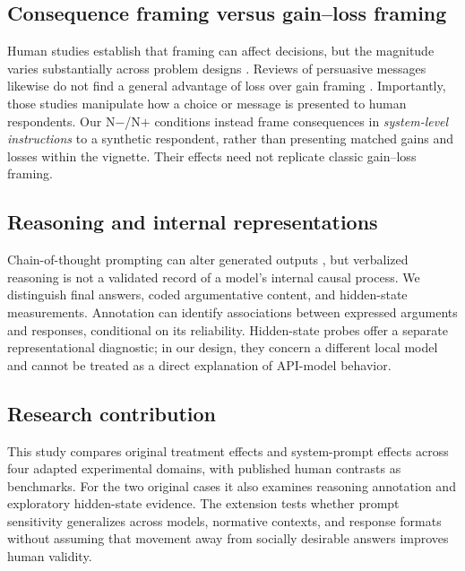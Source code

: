 \subsection{Consequence framing versus gain--loss framing}

Human studies establish that framing can affect decisions, but the magnitude varies substantially across problem designs \cite{kuhberger1998}. Reviews of persuasive messages likewise do not find a general advantage of loss over gain framing \cite{okeefeJensen2006}. Importantly, those studies manipulate how a choice or message is presented to human respondents. Our N$-$/N$+$ conditions instead frame consequences in \emph{system-level instructions} to a synthetic respondent, rather than presenting matched gains and losses within the vignette. Their effects need not replicate classic gain--loss framing.

\subsection{Reasoning and internal representations}

Chain-of-thought prompting can alter generated outputs \cite{wei2022,kojima2022}, but verbalized reasoning is not a validated record of a model's internal causal process. We distinguish final answers, coded argumentative content, and hidden-state measurements. Annotation can identify associations between expressed arguments and responses, conditional on its reliability. Hidden-state probes offer a separate representational diagnostic; in our design, they concern a different local model and cannot be treated as a direct explanation of API-model behavior.

\subsection*{Research contribution}

This study compares original treatment effects and system-prompt effects across four adapted experimental domains, with published human contrasts as benchmarks. For the two original cases it also examines reasoning annotation and exploratory hidden-state evidence. The extension tests whether prompt sensitivity generalizes across models, normative contexts, and response formats without assuming that movement away from socially desirable answers improves human validity.
